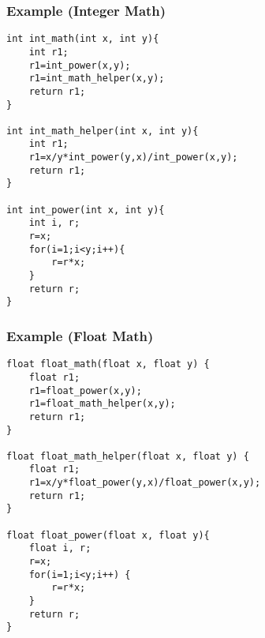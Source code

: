 \begin{frame}[fragile]
  \frametitle{Example (Integer Math)}

  
\large
\begin{changemargin}{1.5cm}
  \begin{lstlisting}
int int_math(int x, int y){
    int r1;
    r1=int_power(x,y);
    r1=int_math_helper(x,y);
    return r1;
}

int int_math_helper(int x, int y){
    int r1;
    r1=x/y*int_power(y,x)/int_power(x,y);
    return r1;
}

int int_power(int x, int y){
    int i, r;
    r=x;
    for(i=1;i<y;i++){
        r=r*x;
    }
    return r;
}
  \end{lstlisting}
  \end{changemargin}
\end{frame}


\begin{frame}[fragile]
  \frametitle{Example (Float Math)}

\large
\begin{changemargin}{1.5cm}
  
  \begin{lstlisting}
float float_math(float x, float y) {
    float r1;
    r1=float_power(x,y);
    r1=float_math_helper(x,y);
    return r1;
}

float float_math_helper(float x, float y) {
    float r1;
    r1=x/y*float_power(y,x)/float_power(x,y);
    return r1;
}

float float_power(float x, float y){
    float i, r;
    r=x;
    for(i=1;i<y;i++) {
        r=r*x;
    }
    return r;
}
  \end{lstlisting}
  \end{changemargin}

\end{frame}

